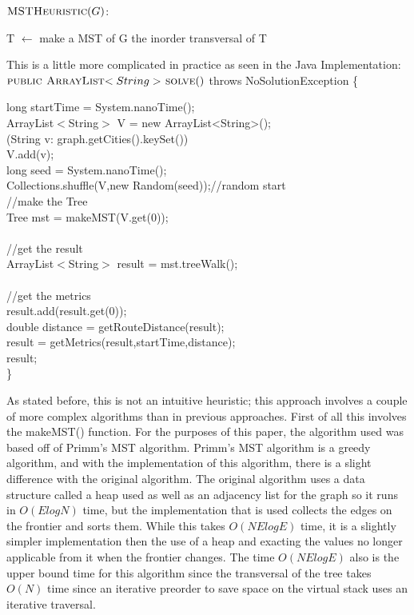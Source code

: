 \documentclass[midd]{thesis}
\newcommand{\tab}{\hspace*{2em}}
\begin{document}
$\textnormal{\scshape MSTHeuristic}(G)$:
\begin{codebox}
\li T $\gets$ make a MST of G
\li \Return the inorder transversal of T
\end{codebox}
This is a little more complicated in practice as seen in the Java Implementation:\\
$\textnormal{\scshape public ArrayList$<String>$ solve}()$ throws NoSolutionException \{
\begin{codebox}
\tab long startTime = System.nanoTime();\\
\tab ArrayList$<$String$>$ V = new ArrayList<String>();\\
\tab \For(String v: graph.getCities().keySet())\\
\tab\tab V.add(v);\End\\
\tab long seed = System.nanoTime();\\
\tab Collections.shuffle(V,new Random(seed));//random start\\
\tab//make the Tree\\
\tab Tree mst = makeMST(V.get(0));\\\\
\tab//get the result\\
\tab ArrayList$<$String$>$ result = mst.treeWalk();\\\\	
\tab//get the metrics\\
\tab result.add(result.get(0));\\
\tab double distance = getRouteDistance(result);\\
\tab result = getMetrics(result,startTime,distance);\\
\Return result;\\
\}
\end{codebox}
\tab As stated before, this is not an intuitive heuristic; this approach involves a couple of more complex algorithms than in previous approaches. First of all this involves the makeMST() function. For the purposes of this paper, the algorithm used was based off of Primm's MST algorithm. Primm's MST algorithm is a greedy algorithm, and with the implementation of this algorithm, there is a slight difference with the original algorithm. The original algorithm uses a data structure called a heap used as well as an adjacency list for the graph so it runs in $O(ElogN)$ time, but the implementation that is used collects the edges on the frontier and sorts them. While this takes $O(NElogE)$ time, it is a slightly simpler implementation then the use of a heap and exacting the values no longer applicable from it when the frontier changes. The time $O(NElogE)$ also is the upper bound time for this algorithm since the transversal of the tree takes $O(N)$ time since an iterative preorder to save space on the virtual stack uses an iterative traversal.\\
\end{document}
